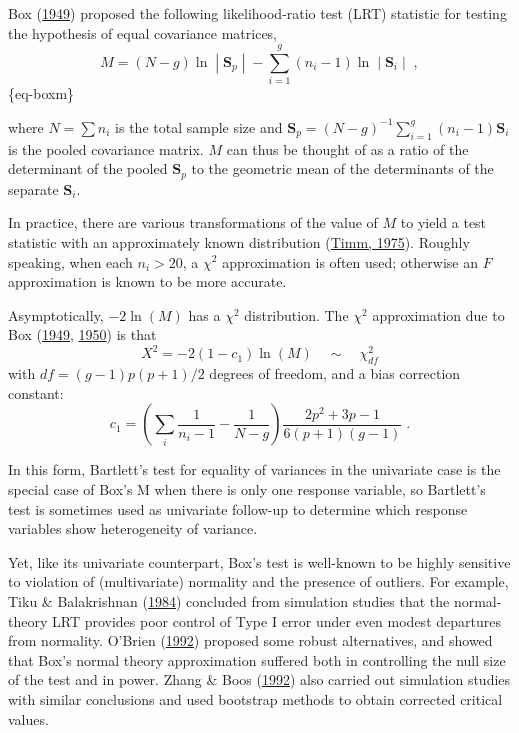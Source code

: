 \documentclass[
  letterpaper,
  10pt,
  krantz2]{krantz}
\begin{document}
Box (\protect\hyperlink{ref-Box:1949}{1949}) proposed the following
likelihood-ratio test (LRT) statistic for testing the hypothesis of
equal covariance matrices, \[
M = (N -g) \ln \;|\; \mathbf{S}_p \;|\; - \sum_{i=1}^g (n_i -1) \ln \;|\; \mathbf{S}_i \;|\; \; ,
\] \{eq-boxm\}

where \(N = \sum n_i\) is the total sample size and
\(\mathbf{S}_p = (N-g)^{-1} \sum_{i=1}^g (n_i - 1) \mathbf{S}_i\) is the
pooled covariance matrix. \(M\) can thus be thought of as a ratio of the
determinant of the pooled \(\mathbf{S}_p\) to the geometric mean of the
determinants of the separate \(\mathbf{S}_i\).

In practice, there are various transformations of the value of \(M\) to
yield a test statistic with an approximately known distribution
(\protect\hyperlink{ref-Timm:75}{Timm, 1975}). Roughly speaking, when
each \(n_i > 20\), a \(\chi^2\) approximation is often used; otherwise
an \(F\) approximation is known to be more accurate.

Asymptotically, \(-2 \ln (M)\) has a \(\chi^2\) distribution. The
\(\chi^2\) approximation due to Box
(\protect\hyperlink{ref-Box:1949}{1949},
\protect\hyperlink{ref-Box:1950}{1950}) is that \[
X^2 = -2 (1-c_1) \ln (M) \quad \sim \quad \chi^2_{df}
\] with \(df = (g-1) p (p+1)/2\) degrees of freedom, and a bias
correction constant: \[
c_1 = \left( 
\sum_i \frac{1}{n_i -1}
- \frac{1}{N-g}
\right)
\frac{2p^2 +3p -1}{6 (p+1)(g-1)} \; .
\]

In this form, Bartlett's test for equality of variances in the
univariate case is the special case of Box's M when there is only one
response variable, so Bartlett's test is sometimes used as univariate
follow-up to determine which response variables show heterogeneity of
variance.

Yet, like its univariate counterpart, Box's test is well-known to be
highly sensitive to violation of (multivariate) normality and the
presence of outliers. For example, Tiku \& Balakrishnan
(\protect\hyperlink{ref-TikuBalakrishnan:1984}{1984}) concluded from
simulation studies that the normal-theory LRT provides poor control of
Type I error under even modest departures from normality. O'Brien
(\protect\hyperlink{ref-OBrien:1992}{1992}) proposed some robust
alternatives, and showed that Box's normal theory approximation suffered
both in controlling the null size of the test and in power. Zhang \&
Boos (\protect\hyperlink{ref-ZhangBoos:1992:BCV}{1992}) also carried out
simulation studies with similar conclusions and used bootstrap methods
to obtain corrected critical values.
\end{document}
